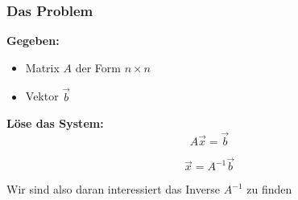     \begin{frame}
        \frametitle{Das Problem}

        \textbf{Gegeben:}
        \begin{itemize}
            \item Matrix $A$ der Form $n \times n$
            \item Vektor $\vec{b}$
       \end{itemize}

       \hfill

       \textbf{Löse das System:}
        $$A \vec{x} = \vec{b}$$

        $$\vec{x} = A^{-1} \vec{b}$$

       \hfill

        Wir sind also daran interessiert das Inverse $A^{-1}$ zu finden

    \end{frame}


        
